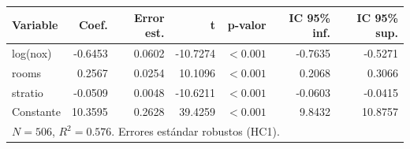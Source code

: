 
\begin{tabular}{lrrrrrr}
\toprule
Variable & Coef. & Error est. & t & p-valor & IC 95\% inf. & IC 95\% sup.\\
\midrule
log(nox) & -0.6453 & 0.0602 & -10.7274 & $<0.001$ & -0.7635 & -0.5271\\
rooms & 0.2567 & 0.0254 & 10.1096 & $<0.001$ & 0.2068 & 0.3066\\
stratio & -0.0509 & 0.0048 & -10.6211 & $<0.001$ & -0.0603 & -0.0415\\
Constante & 10.3595 & 0.2628 & 39.4259 & $<0.001$ & 9.8432 & 10.8757\\
\midrule
\multicolumn{7}{l}{$N=506$, $R^2=0.576$. Errores estándar robustos (HC1).}\\
\bottomrule
\end{tabular}
